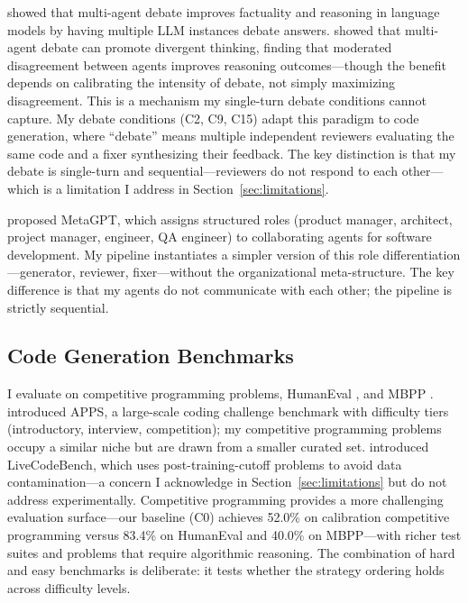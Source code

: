 \documentclass{article}
\begin{document}
\citet{du2023improving} showed that multi-agent debate improves factuality and reasoning in language models by having multiple LLM instances debate answers. \citet{liang2023encouraging} showed that multi-agent debate can promote divergent thinking, finding that moderated disagreement between agents improves reasoning outcomes---though the benefit depends on calibrating the intensity of debate, not simply maximizing disagreement. This is a mechanism my single-turn debate conditions cannot capture. My debate conditions (C2, C9, C15) adapt this paradigm to code generation, where ``debate'' means multiple independent reviewers evaluating the same code and a fixer synthesizing their feedback. The key distinction is that my debate is single-turn and sequential---reviewers do not respond to each other---which is a limitation I address in Section~\ref{sec:limitations}.

\citet{hong2023metagpt} proposed MetaGPT, which assigns structured roles (product manager, architect, project manager, engineer, QA engineer) to collaborating agents for software development. My pipeline instantiates a simpler version of this role differentiation---generator, reviewer, fixer---without the organizational meta-structure. The key difference is that my agents do not communicate with each other; the pipeline is strictly sequential.

\subsection{Code Generation Benchmarks}

I evaluate on competitive programming problems, HumanEval \citep{chen2021evaluating}, and MBPP \citep{austin2021program}. \citet{hendrycks2021apps} introduced APPS, a large-scale coding challenge benchmark with difficulty tiers (introductory, interview, competition); my competitive programming problems occupy a similar niche but are drawn from a smaller curated set. \citet{jain2024livecodebench} introduced LiveCodeBench, which uses post-training-cutoff problems to avoid data contamination---a concern I acknowledge in Section~\ref{sec:limitations} but do not address experimentally. Competitive programming provides a more challenging evaluation surface---our baseline (C0) achieves 52.0\% on calibration competitive programming versus 83.4\% on HumanEval and 40.0\% on MBPP---with richer test suites and problems that require algorithmic reasoning. The combination of hard and easy benchmarks is deliberate: it tests whether the strategy ordering holds across difficulty levels.
\end{document}
